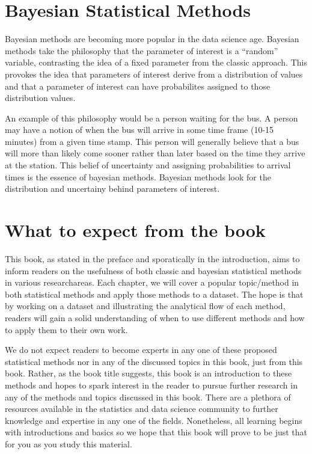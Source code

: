\documentclass[
  letterpaper,
  DIV=11,
  numbers=noendperiod]{scrreprt}
\begin{document}
\hypertarget{bayesian-statistical-methods}{%
\section{Bayesian Statistical
Methods}\label{bayesian-statistical-methods}}

Bayesian methods are becoming more popular in the data science age.
Bayesian methods take the philosophy that the parameter of interest is a
``random'' variable, contrasting the idea of a fixed parameter from the
classic approach. This provokes the idea that parameters of interest
derive from a distribution of values and that a parameter of interest
can have probabilites assigned to those distribution values.

An example of this philosophy would be a person waiting for the bus. A
person may have a notion of when the bus will arrive in some time frame
(10-15 minutes) from a given time stamp. This person will generally
believe that a bus will more than likely come sooner rather than later
based on the time they arrive at the station. This belief of uncertainty
and assigning probabilities to arrival times is the essence of bayesian
methods. Bayesian methods look for the distribution and uncertainy
behind parameters of interest.

\hypertarget{what-to-expect-from-the-book}{%
\section{What to expect from the
book}\label{what-to-expect-from-the-book}}

This book, as stated in the preface and sporatically in the
introduction, aims to inform readers on the usefulness of both classic
and bayesian statistical methods in various researchareas. Each chapter,
we will cover a popular topic/method in both statistical methods and
apply those methods to a dataset. The hope is that by working on a
dataset and illustrating the analytical flow of each method, readers
will gain a solid understanding of when to use different methods and how
to apply them to their own work.

We do not expect readers to become experts in any one of these proposed
statistical methods nor in any of the discussed topics in this book,
just from this book. Rather, as the book title suggests, this book is an
introduction to these methods and hopes to spark interest in the reader
to pursue further research in any of the methods and topics discussed in
this book. There are a plethora of resources available in the statistics
and data science community to further knowledge and expertise in any one
of the fields. Nonetheless, all learning begins with introductions and
basics so we hope that this book will prove to be just that for you as
you study this material.
\end{document}
